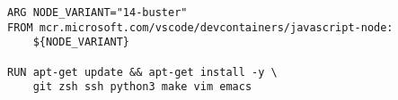 
\begin{lstlisting}[language=docker, frame=single, caption={NodeJS DevContainer Dockerfile},label=code::docker_dev_node]
ARG NODE_VARIANT="14-buster"
FROM mcr.microsoft.com/vscode/devcontainers/javascript-node:
    ${NODE_VARIANT}

RUN apt-get update && apt-get install -y \
    git zsh ssh python3 make vim emacs
\end{lstlisting}
